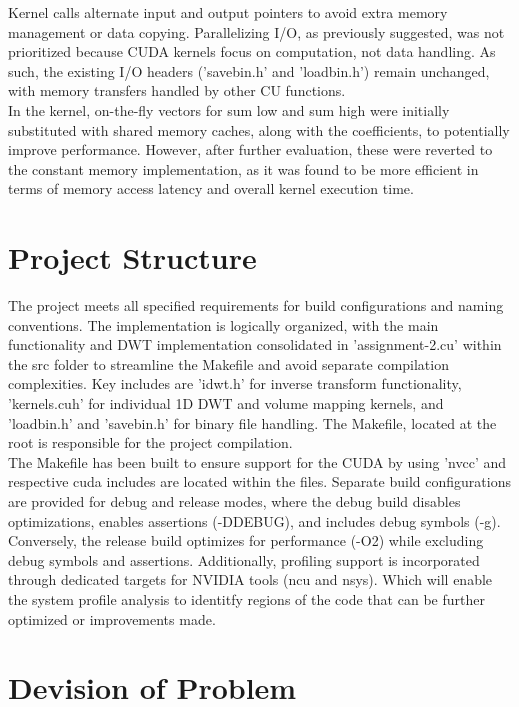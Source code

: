 \documentclass[journal,11pt]{IEEEtran}
\begin{document}
Kernel calls alternate input and output pointers to avoid extra memory management or data copying. Parallelizing I/O, as previously suggested, was not prioritized because CUDA kernels focus on computation, not data handling. As such, the existing I/O headers ('savebin.h' and 'loadbin.h') remain unchanged, with memory transfers handled by other CU functions.\\

In the kernel, on-the-fly vectors for sum low and sum high were initially substituted with shared memory caches, along with the coefficients, to potentially improve performance. However, after further evaluation, these were reverted to the constant memory implementation, as it was found to be more efficient in terms of memory access latency and overall kernel execution time.

\section{Project Structure}
The project meets all specified requirements for build configurations and naming conventions. The implementation is logically organized, with the main functionality and DWT implementation consolidated in 'assignment-2.cu' within the src folder to streamline the Makefile and avoid separate compilation complexities. Key includes are 'idwt.h' for inverse transform functionality, 'kernels.cuh' for individual 1D DWT and volume mapping kernels, and 'loadbin.h' and 'savebin.h' for binary file handling. The Makefile, located at the root is responsible for the project compilation.\\

The Makefile has been built to ensure support for the CUDA by using 'nvcc' and respective cuda includes are located within the files. Separate build configurations are provided for debug and release modes, where the debug build disables optimizations, enables assertions (-DDEBUG), and includes debug symbols (-g). Conversely, the release build optimizes for performance (-O2) while excluding debug symbols and assertions. Additionally, profiling support is incorporated through dedicated targets for NVIDIA tools (ncu and nsys). Which will enable the system profile analysis to identitfy regions of the code that can be further optimized or improvements made.

\section{Devision of Problem}
\end{document}
